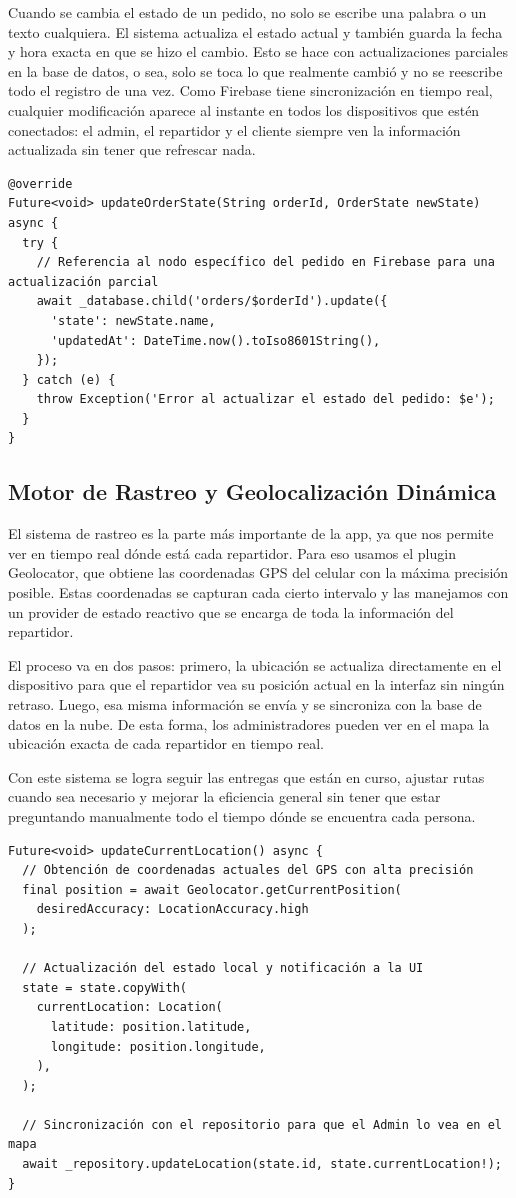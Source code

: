 Cuando se cambia el estado de un pedido, no solo se escribe una palabra o un texto cualquiera. El sistema actualiza el estado actual y también guarda la fecha y hora exacta en que se hizo el cambio. Esto se hace con actualizaciones parciales en la base de datos, o sea, solo se toca lo que realmente cambió y no se reescribe todo el registro de una vez. Como Firebase tiene sincronización en tiempo real, cualquier modificación aparece al instante en todos los dispositivos que estén conectados: el admin, el repartidor y el cliente siempre ven la información actualizada sin tener que refrescar nada.
\begin{lstlisting}
@override
Future<void> updateOrderState(String orderId, OrderState newState) async {
  try {
    // Referencia al nodo específico del pedido en Firebase para una actualización parcial
    await _database.child('orders/$orderId').update({
      'state': newState.name,
      'updatedAt': DateTime.now().toIso8601String(),
    });
  } catch (e) {
    throw Exception('Error al actualizar el estado del pedido: $e');
  }
}
\end{lstlisting}

\subsection{Motor de Rastreo y Geolocalización Dinámica}
El sistema de rastreo es la parte más importante de la app, ya que nos permite ver en tiempo real dónde está cada repartidor. Para eso usamos el plugin Geolocator, que obtiene las coordenadas GPS del celular con la máxima precisión posible. Estas coordenadas se capturan cada cierto intervalo y las manejamos con un provider de estado reactivo que se encarga de toda la información del repartidor.

El proceso va en dos pasos: primero, la ubicación se actualiza directamente en el dispositivo para que el repartidor vea su posición actual en la interfaz sin ningún retraso. Luego, esa misma información se envía y se sincroniza con la base de datos en la nube. De esta forma, los administradores pueden ver en el mapa la ubicación exacta de cada repartidor en tiempo real.

Con este sistema se logra seguir las entregas que están en curso, ajustar rutas cuando sea necesario y mejorar la eficiencia general sin tener que estar preguntando manualmente todo el tiempo dónde se encuentra cada persona.
\begin{lstlisting}
Future<void> updateCurrentLocation() async {
  // Obtención de coordenadas actuales del GPS con alta precisión
  final position = await Geolocator.getCurrentPosition(
    desiredAccuracy: LocationAccuracy.high
  );
  
  // Actualización del estado local y notificación a la UI
  state = state.copyWith(
    currentLocation: Location(
      latitude: position.latitude,
      longitude: position.longitude,
    ),
  );
  
  // Sincronización con el repositorio para que el Admin lo vea en el mapa
  await _repository.updateLocation(state.id, state.currentLocation!);
}
\end{lstlisting}


